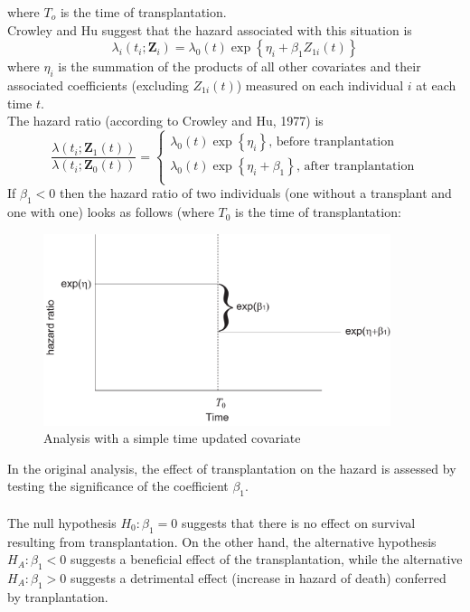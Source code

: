 \documentclass[10pt]{book}
\newcommand{\bfZ}{\mathbf{Z}}
\begin{document}
where $T_o$ is the time of transplantation.\\[2ex]
Crowley and Hu suggest that the hazard associated with this situation is
$$
\lambda_i(t_i;\bfZ_i)=\lambda_0(t)\exp\left \{ \eta_i+\beta_1Z_{1i}(t)\right \}
$$
where $\eta_i$ is the summation of the products of all other covariates and their associated coefficients (excluding $Z_{1i}(t)$) measured on each individual $i$ at each time $t$.
\\[2ex]
The hazard ratio (according to Crowley and Hu, 1977) is
$$
\frac{\lambda(t_i;\bfZ_1(t))}{\lambda(t_i;\bfZ_0(t))}=\left \{ \begin{array}{c}
   \lambda_0(t)\exp\left \{ \eta_i\right \}\mbox{, before tranplantation}\\
  \lambda_0(t)\exp\left \{ \eta_i+\beta_1 \right \}\mbox{, after tranplantation}\\
\end{array}\right .
$$
If $\beta_1<0$ then the hazard ratio of two individuals (one without a transplant and one with one) looks as follows (where $T_0$ is the time of transplantation:
\begin{figure}[ht]
\centerline{\includegraphics[width=4in]{lect8_g2.pdf}}
\caption{Analysis with a simple time updated covariate}
\end{figure}
In the original analysis, the effect of transplantation on the hazard is assessed by testing the significance of the coefficient $\beta_1$.\\
\\[2ex]
The null hypothesis $H_0: \beta_1=0$ suggests that there is no effect on survival resulting from transplantation. On the other hand, the alternative hypothesis $H_A: \beta_1<0$ suggests a beneficial effect of the transplantation, while the alternative $H_A: \beta_1>0$ suggests a detrimental effect (increase in hazard of death) conferred by tranplantation.
\end{document}
